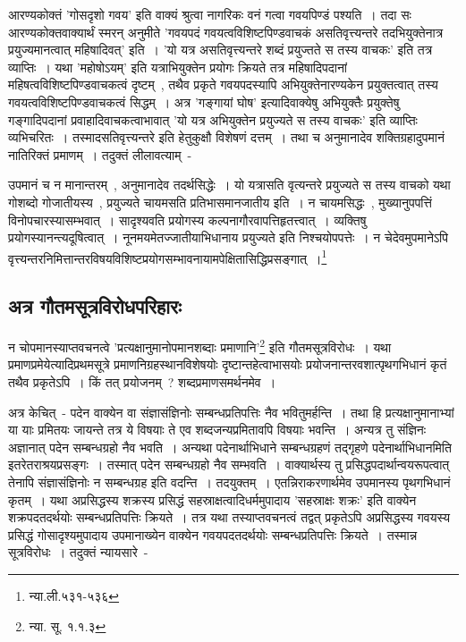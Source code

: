 		आरण्यकोक्तं 'गोसदृशो गवय' इति वाक्यं श्रुत्वा नागरिकः वनं गत्वा गवयपिण्डं पश्यति~। तदा सः आरण्यकोक्तवाक्यार्थं स्मरन् अनुमीते 'गवयपदं गवयत्वविशिष्टपिण्डवाचकं असतिवृत्त्यन्तरे तदभियुक्तेनात्र प्रयुज्यमानत्वात् महिषादिवत्' इति~। 'यो यत्र असतिवृत्त्यन्तरे शब्दं प्रयुज्तते स तस्य वाचकः' इति तत्र व्याप्तिः~। यथा 'महोषोऽयम्' इति यत्राभियुक्तेन प्रयोगः क्रियते तत्र महिषादिपदानां महिषत्वविशिष्टपिण्डवाचकत्वं दृष्टम्~, तथैव प्रकृते गवयपदस्यापि अभियुक्तेनारण्यकेन प्रयुक्तत्वात् तस्य गवयत्वविशिष्टपिण्डवाचकत्वं सिद्धम्~। अत्र 'गङ्गायां घोष' इत्यादिवाक्येषु अभियुक्तैः प्रयुक्तेषु गङ्गादिपदानां प्रवाहादिवाचकत्वाभावात् 'यो यत्र अभियुक्तेन प्रयुज्यते स तस्य वाचकः' इति व्याप्तिः व्यभिचरितः~। तस्मादसतिवृत्त्यन्तरे इति हेतुकुक्षौ विशेषणं दत्तम्~। तथा च अनुमानादेव शक्तिग्रहादुपमानं नातिरिक्तं प्रमाणम्~। तदुक्तं लीलावत्याम्~-

		{\fontsize{11.7}{0}\selectfont\s उपमानं च न मानान्तरम्~, अनुमानादेव तदर्थसिद्धेः~। यो यत्रासति वृत्यन्तरे प्रयुज्यते स तस्य वाचको यथा गोशब्दो गोजातीयस्य~, प्रयुज्यते चायमसति प्रतिभासमानजातीय इति~। न चायमसिद्धः~,  मुख्यानुपपत्तिं विनोपचारस्यासम्भवात्~। सादृश्यवति प्रयोगस्य कल्पनागौरवापत्तिहृतत्त्वात्~। व्यक्तिषु प्रयोगस्यानन्त्यदूषित्वात्~। नूनमयमेतज्जातीयाभिधानाय प्रयुज्यते इति निश्चयोपपत्तेः~। न चेदेवमुपमानेऽपि वृत्त्यन्तरनिमित्तान्तरविषयविशिष्टप्रयोगसम्भावनायामपेक्षितासिद्धिप्रसङ्गात्~।\footnote{न्या.ली.५३१-५३६}}

		\subsection{अत्र गौतमसूत्रविरोधपरिहारः}

		न चोपमानस्याप्तवचनत्वे 'प्रत्यक्षानुमानोपमानशब्दाः प्रमाणानि'\footnote{न्या. सू. १.१.३} इति गौतमसूत्रविरोधः~। यथा प्रमाणप्रमेयेत्यादिप्रथमसूत्रे प्रमाणनिग्रहस्थानविशेषयोः दृष्टान्तहेत्वाभासयोः प्रयोजनान्तरवशात्पृथगभिधानं कृतं तथैव प्रकृतेऽपि~। किं तत् प्रयोजनम्~? शब्दप्रमाणसमर्थनमेव~।

		अत्र केचित्~- पदेन वाक्येन वा संज्ञासंज्ञिनोः सम्बन्धप्रतिपत्तिः नैव भवितुमर्हन्ति~। तथा हि प्रत्यक्षानुमानाभ्यां या याः प्रमितयः जायन्ते तत्र ये विषयाः ते एव शब्दजन्यप्रमितावपि विषयाः भवन्ति~। अन्यत्र तु संज्ञिनः अज्ञानात् पदेन सम्बन्धग्रहो नैव भवति~। अन्यथा पदेनार्थाभिधाने सम्बन्धग्रहणं तद्गृहणे पदेनार्थाभिधानमिति इतरेतराश्रयप्रसङ्गः~। तस्मात् पदेन सम्बन्धग्रहो नैव सम्भवति~। वाक्यार्थस्य तु प्रसिद्धपदार्थान्वयरूपत्वात् तेनापि संज्ञासंज्ञिनोः न सम्बन्धग्रह इति वदन्ति~। तदयुक्तम्~। एतन्निराकरणार्थमेव उपमानस्य पृथगभिधानं कृतम्~। यथा अप्रसिद्धस्य शक्रस्य प्रसिद्धं सहस्राक्षत्वादिधर्ममुपादाय 'सहस्राक्षः शक्रः' इति वाक्येन शक्रपदतदर्थयोः सम्बन्धप्रतिपत्तिः क्रियते~। तत्र यथा तस्याप्तवचनत्वं तद्वत् प्रकृतेऽपि अप्रसिद्धस्य गवयस्य प्रसिद्धं गोसादृश्यमुपादाय उपमानाख्येन वाक्येन गवयपदतदर्थयोः सम्बन्धप्रतिपत्तिः क्रियते~। तस्मान्न सूत्रविरोधः~। तदुक्तं न्यायसारे~-

